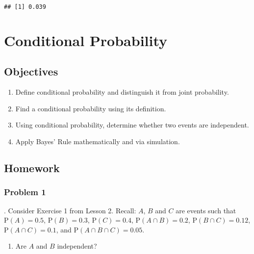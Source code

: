 \documentclass[
]{book}
\providecommand{\tightlist}{%
  \setlength{\itemsep}{0pt}\setlength{\parskip}{0pt}}
\begin{document}
\begin{verbatim}
## [1] 0.039
\end{verbatim}

\hypertarget{CONDPROB}{%
\chapter{Conditional Probability}\label{CONDPROB}}

\newcommand{\E}{\mbox{E}}
\newcommand{\Var}{\mbox{Var}}
\newcommand{\Cov}{\mbox{Cov}}
\newcommand{\Prob}{\mbox{P}}
\newcommand*\diff{\mathop{}\!\mathrm{d}}

\hypertarget{objectives-8}{%
\section{Objectives}\label{objectives-8}}

\begin{enumerate}
\def\labelenumi{\arabic{enumi})}
\tightlist
\item
  Define conditional probability and distinguish it from joint probability.\\
\item
  Find a conditional probability using its definition.\\
\item
  Using conditional probability, determine whether two events are independent.\\
\item
  Apply Bayes' Rule mathematically and via simulation.
\end{enumerate}

\hypertarget{homework-8}{%
\section{Homework}\label{homework-8}}

\hypertarget{problem-1-8}{%
\subsection{Problem 1}\label{problem-1-8}}

. Consider Exercise 1 from Lesson 2. Recall: \(A\), \(B\) and \(C\) are events such that \(\mbox{P}(A)=0.5\), \(\mbox{P}(B)=0.3\), \(\mbox{P}(C)=0.4\), \(\mbox{P}(A \cap B)=0.2\), \(\mbox{P}(B \cap C)=0.12\), \(\mbox{P}(A \cap C)=0.1\), and \(\mbox{P}(A \cap B \cap C)=0.05\).

\begin{enumerate}
\def\labelenumi{\alph{enumi}.}
\tightlist
\item
  Are \(A\) and \(B\) independent?
\end{enumerate}
\end{document}
